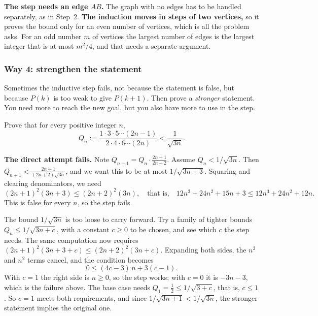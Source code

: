 \documentclass[10pt]{scrartcl}
\begin{document}
\begin{trapbox}
  \ii \textbf{The step needs an edge $AB$.} The graph with no edges has to be handled separately, as in Step~2.
  \ii \textbf{The induction moves in steps of two vertices,} so it proves the bound only for an even number of vertices, which is all the problem asks. For an odd number $m$ of vertices the largest number of edges is the largest integer that is at most $m^2/4$, and that needs a separate argument.
\end{trapbox}

\subsubsection*{Way 4: strengthen the statement}
Sometimes the inductive step fails, not because the statement is false, but because $P(k)$ is too weak to give $P(k+1)$. Then prove a \emph{stronger} statement. You need more to reach the new goal, but you also have more to use in the step.

\begin{example*}
  Prove that for every positive integer $n$,
  \[ Q_n := \frac{1 \cdot 3 \cdot 5 \cdots (2n-1)}{2 \cdot 4 \cdot 6 \cdots (2n)} < \frac{1}{\sqrt{3n}}. \]
\end{example*}

\textbf{The direct attempt fails.} Note $Q_{n+1} = Q_n \cdot \frac{2n+1}{2n+2}$. Assume $Q_n < 1/\sqrt{3n}$. Then $Q_{n+1} < \frac{2n+1}{(2n+2)\sqrt{3n}}$, and we want this to be at most $1/\sqrt{3n+3}$. Squaring and clearing denominators, we need
\[ (2n+1)^2(3n+3) \le (2n+2)^2 (3n), \quad\text{that is,}\quad 12n^3 + 24n^2 + 15n + 3 \le 12n^3 + 24n^2 + 12n. \]
This is false for every $n$, so the step fails.

\begin{ideabox}
  The bound $1/\sqrt{3n}$ is too loose to carry forward. Try a family of tighter bounds $Q_n \le 1/\sqrt{3n + c}$, with a constant $c \geq 0$ to be chosen, and see which $c$ the step needs. The same computation now requires $(2n+1)^2(3n+3+c) \le (2n+2)^2(3n+c)$. Expanding both sides, the $n^3$ and $n^2$ terms cancel, and the condition becomes
  \[ 0 \le (4c - 3)\,n + 3(c - 1). \]
  With $c = 1$ the right side is $n \ge 0$, so the step works; with $c = 0$ it is $-3n - 3$, which is the failure above. The base case needs $Q_1 = \tfrac12 \le 1/\sqrt{3 + c}$, that is, $c \le 1$. So $c = 1$ meets both requirements, and since $1/\sqrt{3n+1} < 1/\sqrt{3n}$, the stronger statement implies the original one.
\end{ideabox}
\end{document}

